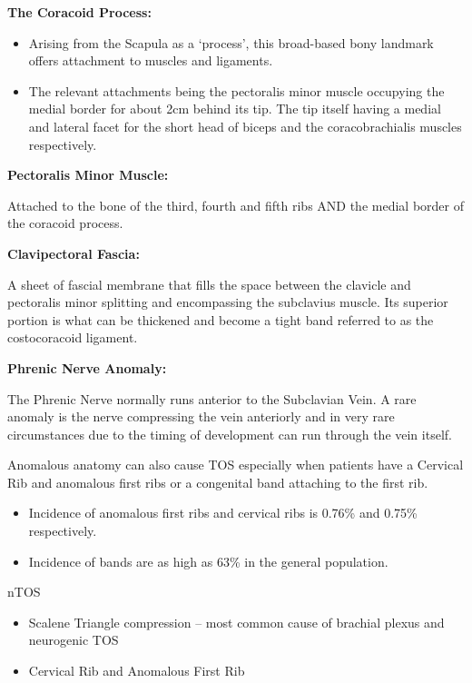 \documentclass[
]{book}
\begin{document}
\textbf{The Coracoid Process:}~

\begin{itemize}
\item
  Arising from the Scapula as a `process', this broad-based bony
  landmark offers attachment to muscles and ligaments.
\item
  The relevant attachments being the pectoralis minor muscle occupying
  the medial border for about 2cm behind its tip. The tip itself
  having a medial and lateral facet for the short head of biceps and
  the coracobrachialis muscles respectively.
\end{itemize}

\textbf{Pectoralis Minor Muscle:}

Attached to the bone of the third, fourth and fifth ribs AND the medial
border of the coracoid process.~

\textbf{Clavipectoral Fascia:}

A sheet of fascial membrane that fills the space between the clavicle
and pectoralis minor splitting and encompassing the subclavius muscle.
Its superior portion is what can be thickened and become a tight band
referred to as the costocoracoid ligament.~

\textbf{Phrenic Nerve Anomaly:}

The Phrenic Nerve normally runs anterior to the Subclavian Vein. A rare
anomaly is the nerve compressing the vein anteriorly and in very rare
circumstances due to the timing of development can run through the vein
itself.

Anomalous anatomy can also cause TOS especially when patients have a
Cervical Rib and anomalous first ribs or a congenital band attaching to
the first rib.

\begin{itemize}
\item
  Incidence of anomalous first ribs and cervical ribs is 0.76\% and
  0.75\% respectively.~
\item
  Incidence of bands are as high as 63\% in the general population.
  \citep{humphries124ThoracicOutlet2019}
\end{itemize}

nTOS~~

\begin{itemize}
\item
  Scalene Triangle compression -- most common cause of brachial plexus
  and neurogenic TOS
\item
  Cervical Rib and Anomalous First Rib
\end{itemize}
\end{document}
